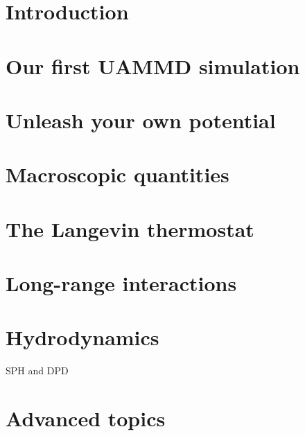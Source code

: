 \documentclass[a4paper,12pt,openany,hidelinks]{book}
\begin{document}

\tableofcontents

\chapter*{Introduction}



\chapter{Our first UAMMD simulation}



\chapter{Unleash your own potential}



\chapter{Macroscopic quantities}



\chapter{The Langevin thermostat}



\chapter{Long-range interactions}

\chapter{Hydrodynamics}

SPH and DPD

\chapter{Advanced topics}
\end{document}
